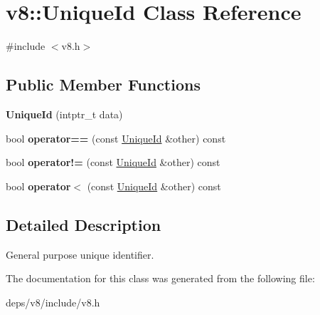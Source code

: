 \hypertarget{classv8_1_1_unique_id}{}\section{v8\+:\+:Unique\+Id Class Reference}
\label{classv8_1_1_unique_id}


{\ttfamily \#include $<$v8.\+h$>$}

\subsection*{Public Member Functions}
\begin{DoxyCompactItemize}
\item 
\hypertarget{classv8_1_1_unique_id_a94ba72efbc70dee13184b444c3d2399a}{}{\bfseries Unique\+Id} (intptr\+\_\+t data)\label{classv8_1_1_unique_id_a94ba72efbc70dee13184b444c3d2399a}

\item 
\hypertarget{classv8_1_1_unique_id_a157844a8c7cbeb43282670f7a233e1d0}{}bool {\bfseries operator==} (const \hyperlink{classv8_1_1_unique_id}{Unique\+Id} \&other) const \label{classv8_1_1_unique_id_a157844a8c7cbeb43282670f7a233e1d0}

\item 
\hypertarget{classv8_1_1_unique_id_a16bdf3163cdacfaabed5cc253d948c10}{}bool {\bfseries operator!=} (const \hyperlink{classv8_1_1_unique_id}{Unique\+Id} \&other) const \label{classv8_1_1_unique_id_a16bdf3163cdacfaabed5cc253d948c10}

\item 
\hypertarget{classv8_1_1_unique_id_a189ed3914fea0157f00892b5e8f081f3}{}bool {\bfseries operator$<$} (const \hyperlink{classv8_1_1_unique_id}{Unique\+Id} \&other) const \label{classv8_1_1_unique_id_a189ed3914fea0157f00892b5e8f081f3}

\end{DoxyCompactItemize}


\subsection{Detailed Description}
General purpose unique identifier. 

The documentation for this class was generated from the following file\+:\begin{DoxyCompactItemize}
\item 
deps/v8/include/v8.\+h\end{DoxyCompactItemize}
